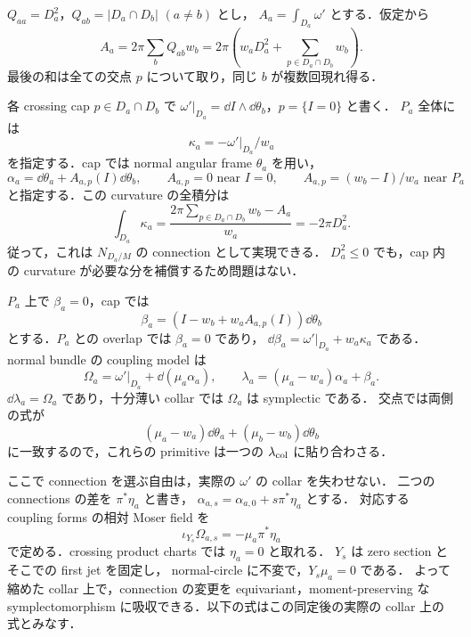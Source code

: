 $Q_{aa}=D_a^2$，$Q_{ab}=|D_a\cap D_b|$ $(a\neq b)$ とし，
$A_a=\int_{D_a}\omega'$ とする．仮定から
\begin{equation}\label{snc:area-balance}
 A_a=2\pi\sum_b Q_{ab}w_b
 =2\pi\left(w_aD_a^2+\sum_{p\in D_a\cap D_b}w_b\right).
\end{equation}
最後の和は全ての交点 $p$ について取り，同じ $b$ が複数回現れ得る．

各 crossing cap $p\in D_a\cap D_b$ で
$\omega'|_{D_a}=\dd I\wedge\dd\theta_b$，$p=\{I=0\}$ と書く．
$P_a$ 全体には
\[
 \kappa_a=-\omega'|_{D_a}/w_a
\]
を指定する．cap では normal angular frame $\theta_a$ を用い，
\begin{equation}\label{snc:connection-cap}
 \alpha_a=\dd\theta_a+A_{a,p}(I)\dd\theta_b,\qquad
 A_{a,p}=0\text{ near }I=0,\qquad
 A_{a,p}=(w_b-I)/w_a\text{ near }P_a
\end{equation}
と指定する．この curvature の全積分は
\begin{equation}\label{snc:curvature-integral}
 \int_{D_a}\kappa_a
 =\frac{2\pi\sum_{p\in D_a\cap D_b}w_b-A_a}{w_a}
 =-2\pi D_a^2.
\end{equation}
従って，これは $N_{D_a/M}$ の connection として実現できる．
$D_a^2\leq0$ でも，cap 内の curvature が必要な分を補償するため問題はない．

$P_a$ 上で $\beta_a=0$，cap では
\[
 \beta_a=(I-w_b+w_aA_{a,p}(I))\dd\theta_b
\]
とする．$P_a$ との overlap では $\beta_a=0$ であり，
$\dd\beta_a=\omega'|_{D_a}+w_a\kappa_a$ である．
normal bundle の coupling model は
\begin{equation}\label{snc:coupling}
 \Omega_a=\omega'|_{D_a}+\dd(\mu_a\alpha_a),\qquad
 \lambda_a=(\mu_a-w_a)\alpha_a+\beta_a.
\end{equation}
$\dd\lambda_a=\Omega_a$ であり，十分薄い collar では $\Omega_a$ は symplectic である．
交点では両側の式が
\[
 (\mu_a-w_a)\dd\theta_a+(\mu_b-w_b)\dd\theta_b
\]
に一致するので，これらの primitive は一つの
$\lambda_{\rm col}$ に貼り合わさる．

ここで connection を選ぶ自由は，実際の $\omega'$ の collar を失わせない．
二つの connections の差を $\pi^*\eta_a$ と書き，
$\alpha_{a,s}=\alpha_{a,0}+s\pi^*\eta_a$ とする．
対応する coupling forms の相対 Moser field を
\[
 \iota_{Y_s}\Omega_{a,s}=-\mu_a\pi^*\eta_a
\]
で定める．crossing product charts では $\eta_a=0$ と取れる．
$Y_s$ は zero section とそこでの first jet を固定し，
normal-circle に不変で，$Y_s\mu_a=0$ である．
よって縮めた collar 上で，connection の変更を equivariant，moment-preserving な
symplectomorphism に吸収できる．以下の式はこの同定後の実際の collar 上の式とみなす．

